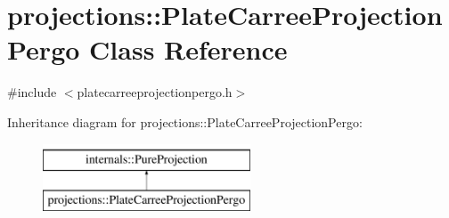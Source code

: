 \hypertarget{classprojections_1_1_plate_carree_projection_pergo}{\section{projections\-:\-:Plate\-Carree\-Projection\-Pergo Class Reference}
\label{classprojections_1_1_plate_carree_projection_pergo}
}


{\ttfamily \#include $<$platecarreeprojectionpergo.\-h$>$}

Inheritance diagram for projections\-:\-:Plate\-Carree\-Projection\-Pergo\-:\begin{figure}[H]
\begin{center}
\leavevmode
\includegraphics[height=2.000000cm]{classprojections_1_1_plate_carree_projection_pergo}
\end{center}
\end{figure}
